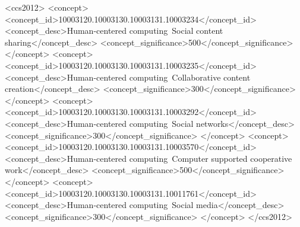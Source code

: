 \documentclass[acmsmall,authordraft]{acmart}
\begin{document}
\begin{CCSXML}
<ccs2012>
   <concept>
       <concept_id>10003120.10003130.10003131.10003234</concept_id>
       <concept_desc>Human-centered computing~Social content sharing</concept_desc>
       <concept_significance>500</concept_significance>
       </concept>
   <concept>
       <concept_id>10003120.10003130.10003131.10003235</concept_id>
       <concept_desc>Human-centered computing~Collaborative content creation</concept_desc>
       <concept_significance>300</concept_significance>
       </concept>
   <concept>
       <concept_id>10003120.10003130.10003131.10003292</concept_id>
       <concept_desc>Human-centered computing~Social networks</concept_desc>
       <concept_significance>300</concept_significance>
       </concept>
   <concept>
       <concept_id>10003120.10003130.10003131.10003570</concept_id>
       <concept_desc>Human-centered computing~Computer supported cooperative work</concept_desc>
       <concept_significance>500</concept_significance>
       </concept>
   <concept>
       <concept_id>10003120.10003130.10003131.10011761</concept_id>
       <concept_desc>Human-centered computing~Social media</concept_desc>
       <concept_significance>300</concept_significance>
       </concept>
 </ccs2012>
\end{CCSXML}




\maketitle
\end{document}
